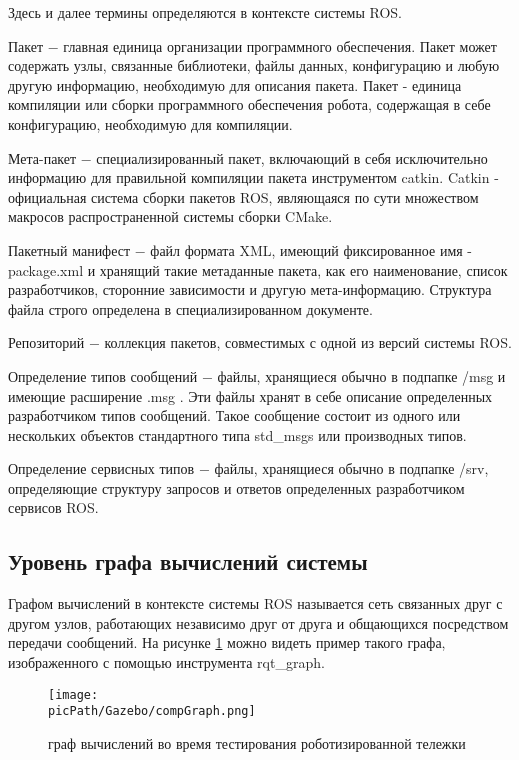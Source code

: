 \documentclass[oneside,final,14pt]{extreport}
\newcommand{\picPath}{img}
\begin{document}
Здесь и далее термины определяются в контексте системы ROS.

Пакет $-$ главная единица организации программного обеспечения. Пакет может содержать узлы, связанные библиотеки, файлы данных, конфигурацию и любую другую информацию, необходимую для описания пакета.  Пакет - единица компиляции или сборки программного обеспечения робота, содержащая в себе конфигурацию, необходимую для компиляции. 

Мета-пакет $-$ специализированный пакет, включающий в себя исключительно информацию для правильной компиляции пакета инструментом catkin. Catkin - официальная система сборки пакетов ROS, являющаяся по сути множеством макросов распространенной системы сборки CMake.

Пакетный манифест $-$ файл формата XML, имеющий фиксированное имя - package.xml и хранящий такие метаданные пакета, как его наименование, список разработчиков, сторонние зависимости и другую мета-информацию. Структура файла строго определена в специализированном документе.

Репозиторий $-$ коллекция пакетов, совместимых с одной из версий системы  ROS.

Определение типов сообщений $-$ файлы, хранящиеся обычно в подпапке /msg и имеющие расширение  .msg . Эти файлы хранят в себе описание определенных разработчиком типов сообщений. Такое сообщение состоит из одного или нескольких объектов стандартного типа std_msgs или производных типов. 

Определение сервисных типов $-$ файлы, хранящиеся обычно в подпапке /srv, определяющие структуру запросов и ответов определенных разработчиком сервисов ROS.
\subsection{Уровень графа вычислений системы}

Графом вычислений в контексте системы ROS называется сеть связанных друг с другом узлов, работающих независимо друг от друга и общающихся посредством передачи сообщений. 
На рисунке \ref{Figure:gazeboGraph} можно видеть пример такого графа, изображенного с помощью инструмента rqt_graph.


\begin{figure}[H]
\begin{center}
\texttt{[image: \\picPath/Gazebo/compGraph.png]}
\end{center}
  \caption{ граф вычислений во время тестирования роботизированной тележки }
  \label{Figure:gazeboGraph}
\end{figure}
\end{document}
